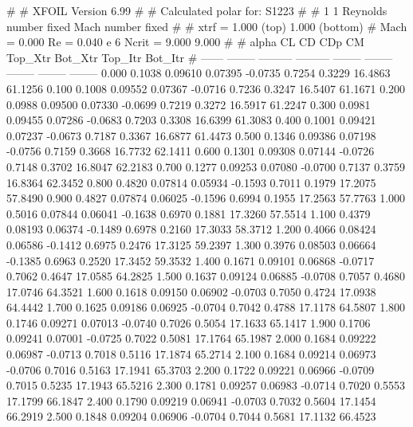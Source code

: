 #  
#       XFOIL         Version 6.99
#  
# Calculated polar for: S1223                                           
#  
# 1 1 Reynolds number fixed          Mach number fixed         
#  
# xtrf =   1.000 (top)        1.000 (bottom)  
# Mach =   0.000     Re =     0.040 e 6     Ncrit =   9.000  9.000
#  
#   alpha    CL        CD       CDp       CM     Top_Xtr  Bot_Xtr  Top_Itr  Bot_Itr
#  ------ -------- --------- --------- -------- -------- -------- -------- --------
   0.000   0.1038   0.09610   0.07395  -0.0735   0.7254   0.3229  16.4863  61.1256
   0.100   0.1008   0.09552   0.07367  -0.0716   0.7236   0.3247  16.5407  61.1671
   0.200   0.0988   0.09500   0.07330  -0.0699   0.7219   0.3272  16.5917  61.2247
   0.300   0.0981   0.09455   0.07286  -0.0683   0.7203   0.3308  16.6399  61.3083
   0.400   0.1001   0.09421   0.07237  -0.0673   0.7187   0.3367  16.6877  61.4473
   0.500   0.1346   0.09386   0.07198  -0.0756   0.7159   0.3668  16.7732  62.1411
   0.600   0.1301   0.09308   0.07144  -0.0726   0.7148   0.3702  16.8047  62.2183
   0.700   0.1277   0.09253   0.07080  -0.0700   0.7137   0.3759  16.8364  62.3452
   0.800   0.4820   0.07814   0.05934  -0.1593   0.7011   0.1979  17.2075  57.8490
   0.900   0.4827   0.07874   0.06025  -0.1596   0.6994   0.1955  17.2563  57.7763
   1.000   0.5016   0.07844   0.06041  -0.1638   0.6970   0.1881  17.3260  57.5514
   1.100   0.4379   0.08193   0.06374  -0.1489   0.6978   0.2160  17.3033  58.3712
   1.200   0.4066   0.08424   0.06586  -0.1412   0.6975   0.2476  17.3125  59.2397
   1.300   0.3976   0.08503   0.06664  -0.1385   0.6963   0.2520  17.3452  59.3532
   1.400   0.1671   0.09101   0.06868  -0.0717   0.7062   0.4647  17.0585  64.2825
   1.500   0.1637   0.09124   0.06885  -0.0708   0.7057   0.4680  17.0746  64.3521
   1.600   0.1618   0.09150   0.06902  -0.0703   0.7050   0.4724  17.0938  64.4442
   1.700   0.1625   0.09186   0.06925  -0.0704   0.7042   0.4788  17.1178  64.5807
   1.800   0.1746   0.09271   0.07013  -0.0740   0.7026   0.5054  17.1633  65.1417
   1.900   0.1706   0.09241   0.07001  -0.0725   0.7022   0.5081  17.1764  65.1987
   2.000   0.1684   0.09222   0.06987  -0.0713   0.7018   0.5116  17.1874  65.2714
   2.100   0.1684   0.09214   0.06973  -0.0706   0.7016   0.5163  17.1941  65.3703
   2.200   0.1722   0.09221   0.06966  -0.0709   0.7015   0.5235  17.1943  65.5216
   2.300   0.1781   0.09257   0.06983  -0.0714   0.7020   0.5553  17.1799  66.1847
   2.400   0.1790   0.09219   0.06941  -0.0703   0.7032   0.5604  17.1454  66.2919
   2.500   0.1848   0.09204   0.06906  -0.0704   0.7044   0.5681  17.1132  66.4523
